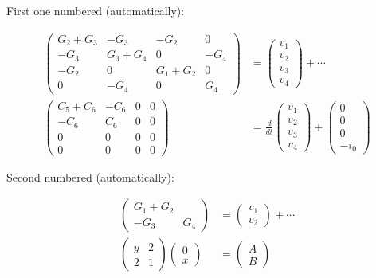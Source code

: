 \documentclass[%
oneside,                 %
final,                   %
10pt]{article}
\theoremstyle{definition}
\begin{document}
\begin{enumerate}

First one numbered (automatically):

\begin{align}
\begin{pmatrix}
G_2 + G_3 & -G_3 & -G_2 & 0 \\ 
-G_3 & G_3 + G_4 & 0 & -G_4 \\ 
-G_2 & 0 & G_1 + G_2 & 0 \\ 
0 & -G_4 & 0 & G_4
\end{pmatrix}
&=
\begin{pmatrix}
 v_1 \\ 
 v_2 \\ 
 v_3 \\ 
 v_4
\end{pmatrix}
+ \cdots \\ 
\begin{pmatrix}
 C_5 + C_6 & -C_6 & 0 & 0 \\ 
 -C_6 & C_6 & 0 & 0 \\ 
 0 & 0 & 0 & 0 \\ 
 0 & 0 & 0 & 0
\end{pmatrix}
  &= \frac{d}{dt}\begin{pmatrix}
 v_1 \\ 
 v_2 \\ 
 v_3 \\ 
 v_4
\end{pmatrix} +
\begin{pmatrix}
 0 \\ 
 0 \\ 
 0 \\ 
 -i_0
\end{pmatrix}
\nonumber
\end{align}

Second numbered (automatically):

\begin{align}
\begin{pmatrix}
G_1 + G_2\\ 
-G_3 & G_4
\end{pmatrix}
&=
\begin{pmatrix}
 v_1 \\ 
 v_2
\end{pmatrix}
+ \cdots\nonumber
\\ 
\left(\begin{array}{ll}
y & 2\\ 
2 & 1
\end{array}\right)
\left(\begin{array}{ll}
0 \\ x
\end{array}\right)
&= \begin{pmatrix}
A \\ B
\end{pmatrix}
\end{align}


\end{enumerate}
\end{document}
